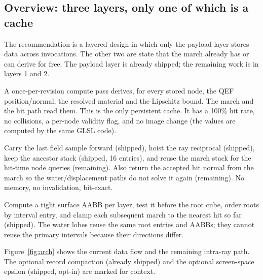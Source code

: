 \documentclass[11pt,a4paper]{article}
\theoremstyle{plain}
\theoremstyle{definition}
\theoremstyle{remark}
\begin{document}
\subsection{Overview: three layers, only one of which is a cache}

The recommendation is a layered design in which only the payload layer stores
data across invocations. The other two are state that the march already has or
can derive for free. The payload layer is already shipped; the remaining work
is in layers 1 and 2.

\begin{description}[leftmargin=1.2em,itemsep=3pt]
\item[Layer 0 --- node payload cache (shipped).] A once-per-revision compute
  pass derives, for every stored node, the QEF position/normal, the resolved
  material and the Lipschitz bound. The march and the hit path read them. This
  is the only persistent cache. It has a 100\% hit rate, no collisions, a
  per-node validity flag, and no image change (the values are computed by the
  same GLSL code).
\item[Layer 1 --- intra-ray state reuse.] Carry the last field sample forward
  (shipped), hoist the ray reciprocal (shipped), keep the ancestor stack
  (shipped, 16 entries), and reuse the march stack for the hit-time node
  queries (remaining). Also return the accepted hit normal from the march so
  the water/displacement paths do not solve it again (remaining). No memory,
  no invalidation, bit-exact.
\item[Layer 2 --- per-root reuse.] Compute a tight surface AABB per layer,
  test it before the root cube, order roots by interval entry, and clamp each
  subsequent march to the nearest hit so far (shipped). The water lobes reuse
  the same root entries and AABBs; they cannot reuse the primary intervals
  because their directions differ.
\end{description}

Figure~\ref{fig:arch} shows the current data flow and the remaining intra-ray
path. The optional record compaction (already shipped) and the optional
screen-space epsilon (shipped, opt-in) are marked for context.
\end{document}
